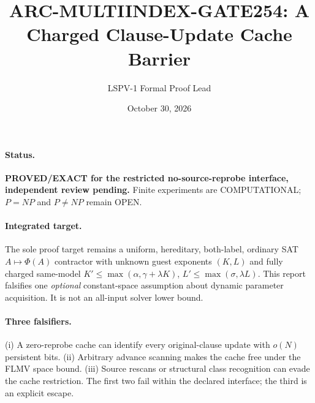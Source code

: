 \documentclass[11pt]{article}
\title{ARC-MULTIINDEX-GATE254: A Charged Clause-Update Cache Barrier}
\author{LSPV-1 Formal Proof Lead}
\date{October 30, 2026}
\begin{document}
\maketitle
\paragraph{Status.}\textbf{PROVED/EXACT for the restricted no-source-reprobe interface, independent review pending.} Finite experiments are COMPUTATIONAL; $P=NP$ and $P\ne NP$ remain OPEN.
\paragraph{Integrated target.} The sole proof target remains a uniform, hereditary, both-label, ordinary SAT $A\mapsto\Phi(A)$ contractor with unknown guest exponents $(K,L)$ and fully charged same-model $K'\le\max(\alpha,\gamma+\lambda K)$, $L'\le\max(\sigma,\lambda L)$. This report falsifies one \emph{optional} constant-space assumption about dynamic parameter acquisition. It is not an all-input solver lower bound.
\paragraph{Three falsifiers.} (i) A zero-reprobe cache can identify every original-clause update with $o(N)$ persistent bits. (ii) Arbitrary advance scanning makes the cache free under the FLMV space bound. (iii) Source rescans or structural class recognition can evade the cache restriction. The first two fail within the declared interface; the third is an explicit escape.
\end{document}
